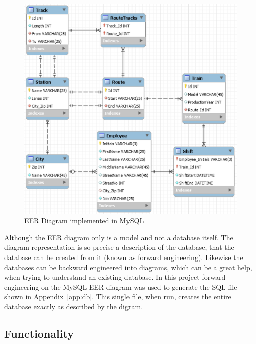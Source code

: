 \begin{figure}[h]
    \centering
    \includegraphics{img/EER.png}
    \caption{EER Diagram implemented in MySQL}
    \label{fig:EER}
\end{figure}

Although the EER diagram only is a model and not a database itself. The diagram 
representation is so precise a description of the database, that the database 
can be created from it (known as forward engineering). Likewise the databases 
can be backward engineered into diagrams, which can be a great help, when 
trying to understand an existing database. In this project forward engineering 
on the MySQL EER diagram was used to generate the SQL file shown in 
Appendix~\ref{app:db}. This single file, when run, creates the entire database 
exactly as described by the digram.


\subsection{Functionality} %

